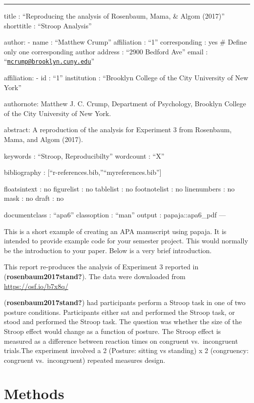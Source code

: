 \documentclass[
  english,
  man]{article}
\author{\phantom{0}}
\date{}
\affiliation{\phantom{0}}
\begin{document}
\begin{center}\rule{0.5\linewidth}{0.5pt}\end{center}

title : ``Reproducing the analysis of Rosenbaum, Mama, \& Algom (2017)''
shorttitle : ``Stroop Analysis''

author:
- name : ``Matthew Crump''
affiliation : ``1''
corresponding : yes \# Define only one corresponding author
address : ``2900 Bedford Ave''
email : ``\href{mailto:mcrump@brooklyn.cuny.edu}{\nolinkurl{mcrump@brooklyn.cuny.edu}}''

affiliation:
- id : ``1''
institution : ``Brooklyn College of the City University of New York''

authornote: \textbar{}
Matthew J. C. Crump, Department of Psychology, Brooklyn College of the City University of New York.

abstract: \textbar{}
A reproduction of the analysis for Experiment 3 from Rosenbaum, Mama, and Algom (2017).

keywords : ``Stroop, Reproducibilty''
wordcount : ``X''

bibliography : {[}``r-references.bib,''``myreferences.bib''{]}

floatsintext : no
figurelist : no
tablelist : no
footnotelist : no
linenumbers : no
mask : no
draft : no

documentclass : ``apa6''
classoption : ``man''
output : papaja::apa6\_pdf
---

This is a short example of creating an APA manuscript using papaja. It is intended to provide example code for your semester project. This would normally be the introduction to your paper. Below is a very brief introduction.

This report re-produces the analysis of Experiment 3 reported in (\textbf{rosenbaum2017stand?}). The data were downloaded from \url{https://osf.io/b7x8q/}

(\textbf{rosenbaum2017stand?}) had participants perform a Stroop task in one of two posture conditions. Participants either sat and performed the Stroop task, or stood and performed the Stroop task. The question was whether the size of the Stroop effect would change as a function of posture. The Stroop effect is measured as a difference between reaction times on congruent vs.~incongruent trials.The experiment involved a 2 (Posture: sitting vs standing) x 2 (congruency: congruent vs.~incongruent) repeated measures design.

\hypertarget{methods}{%
\section{Methods}\label{methods}}
\end{document}
